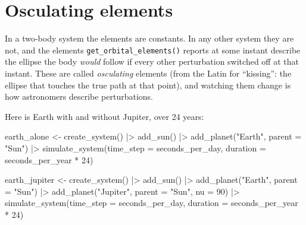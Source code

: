 \documentclass[
  10.5pt,
  letterpaper,
]{scrbook}
\newenvironment{Shaded}{\begin{snugshade}}{\end{snugshade}}
\newcommand{\AttributeTok}[1]{\textcolor[rgb]{0.00,0.00,0.00}{#1}}
\newcommand{\DecValTok}[1]{\textcolor[rgb]{0.00,0.00,0.00}{#1}}
\newcommand{\FunctionTok}[1]{\textcolor[rgb]{0.00,0.00,0.00}{#1}}
\newcommand{\NormalTok}[1]{\textcolor[rgb]{0.00,0.00,0.00}{#1}}
\newcommand{\OtherTok}[1]{\textcolor[rgb]{0.00,0.00,0.00}{#1}}
\newcommand{\SpecialCharTok}[1]{\textcolor[rgb]{0.00,0.00,0.00}{#1}}
\newcommand{\StringTok}[1]{\textcolor[rgb]{0.00,0.00,0.00}{#1}}
\theoremstyle{definition}
\theoremstyle{plain}
\theoremstyle{remark}
\begin{document}
\section{Osculating elements}\label{osculating-elements}

In a two-body system the elements are constants. In any other system
they are not, and the elements \texttt{get\_orbital\_elements()} reports
at some instant describe the ellipse the body \emph{would} follow if
every other perturbation switched off at that instant. These are called
\emph{osculating} elements (from the Latin for ``kissing'': the ellipse
that touches the true path at that point), and watching them change is
how astronomers describe perturbations.

Here is Earth with and without Jupiter, over 24 years:

\begin{Shaded}
\begin{Highlighting}[]
\NormalTok{earth\_alone }\OtherTok{\textless{}{-}} \FunctionTok{create\_system}\NormalTok{() }\SpecialCharTok{|\textgreater{}}
  \FunctionTok{add\_sun}\NormalTok{() }\SpecialCharTok{|\textgreater{}}
  \FunctionTok{add\_planet}\NormalTok{(}\StringTok{"Earth"}\NormalTok{, }\AttributeTok{parent =} \StringTok{"Sun"}\NormalTok{) }\SpecialCharTok{|\textgreater{}}
  \FunctionTok{simulate\_system}\NormalTok{(}\AttributeTok{time\_step =}\NormalTok{ seconds\_per\_day, }\AttributeTok{duration =}\NormalTok{ seconds\_per\_year }\SpecialCharTok{*} \DecValTok{24}\NormalTok{)}

\NormalTok{earth\_jupiter }\OtherTok{\textless{}{-}} \FunctionTok{create\_system}\NormalTok{() }\SpecialCharTok{|\textgreater{}}
  \FunctionTok{add\_sun}\NormalTok{() }\SpecialCharTok{|\textgreater{}}
  \FunctionTok{add\_planet}\NormalTok{(}\StringTok{"Earth"}\NormalTok{,   }\AttributeTok{parent =} \StringTok{"Sun"}\NormalTok{) }\SpecialCharTok{|\textgreater{}}
  \FunctionTok{add\_planet}\NormalTok{(}\StringTok{"Jupiter"}\NormalTok{, }\AttributeTok{parent =} \StringTok{"Sun"}\NormalTok{, }\AttributeTok{nu =} \DecValTok{90}\NormalTok{) }\SpecialCharTok{|\textgreater{}}
  \FunctionTok{simulate\_system}\NormalTok{(}\AttributeTok{time\_step =}\NormalTok{ seconds\_per\_day, }\AttributeTok{duration =}\NormalTok{ seconds\_per\_year }\SpecialCharTok{*} \DecValTok{24}\NormalTok{)}
\end{Highlighting}
\end{Shaded}
\end{document}
